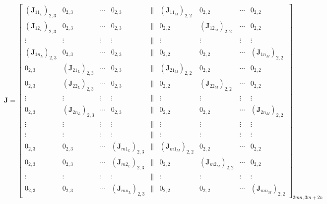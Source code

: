 \begin{equation}
    \mathbf{J} = \begin{bmatrix}
        (\mathbf{J}_{11_L})_{2,3} & 0_{2,3} & \cdots & 0_{2,3} & \parallel & (\mathbf{J}_{11_M})_{2,2} & 0_{2,2} & \cdots & 0_{2,2} \\
        (\mathbf{J}_{12_L})_{2,3} & 0_{2,3} & \cdots & 0_{2,3} & \parallel & 0_{2,2} & (\mathbf{J}_{12_M})_{2,2} & \cdots & 0_{2,2} \\
        \vdots & \vdots & \vdots & \vdots & \parallel & \vdots & \vdots & \vdots & \vdots \\
        (\mathbf{J}_{1n_L})_{2,3} & 0_{2,3} & \cdots & 0_{2,3} & \parallel & 0_{2,2} & 0_{2,2} & \cdots & (\mathbf{J}_{1n_M})_{2,2} \\
        
        0_{2,3} & (\mathbf{J}_{21_L})_{2,3} & \cdots & 0_{2,3} & \parallel & (\mathbf{J}_{21_M})_{2,2} & 0_{2,2} & \cdots & 0_{2,2} \\
        0_{2,3} & (\mathbf{J}_{22_L})_{2,3} & \cdots & 0_{2,3} & \parallel & 0_{2,2} & (\mathbf{J}_{22_M})_{2,2} & \cdots & 0_{2,2} \\
        \vdots & \vdots & \vdots & \vdots & \parallel & \vdots & \vdots & \vdots & \vdots \\
        0_{2,3} & (\mathbf{J}_{2n_L})_{2,3} & \cdots & 0_{2,3} & \parallel & 0_{2,2} & 0_{2,2} & \cdots & (\mathbf{J}_{2n_M})_{2,2} \\

        \vdots & \vdots & \vdots & \vdots & \parallel & \vdots & \vdots & \vdots & \vdots \\
        \vdots & \vdots & \vdots & \vdots & \parallel & \vdots & \vdots & \vdots & \vdots \\
        
        0_{2,3} & 0_{2,3} & \cdots & (\mathbf{J}_{m1_L})_{2,3} & \parallel & (\mathbf{J}_{m1_M})_{2,2} & 0_{2,2} & \cdots & 0_{2,2} \\
        0_{2,3} & 0_{2,3} & \cdots & (\mathbf{J}_{m2_L})_{2,3} & \parallel & 0_{2,2} & (\mathbf{J}_{m2_M})_{2,2} & \cdots & 0_{2,2} \\
        \vdots & \vdots & \vdots & \vdots & \parallel & \vdots & \vdots & \vdots & \vdots \\
        0_{2,3} & 0_{2,3} & \cdots & (\mathbf{J}_{mn_L})_{2,3} & \parallel & 0_{2,2} & 0_{2,2} & \cdots & (\mathbf{J}_{mn_M})_{2,2}        
        \end{bmatrix}_{2mn, 3m+2n}
\end{equation}

